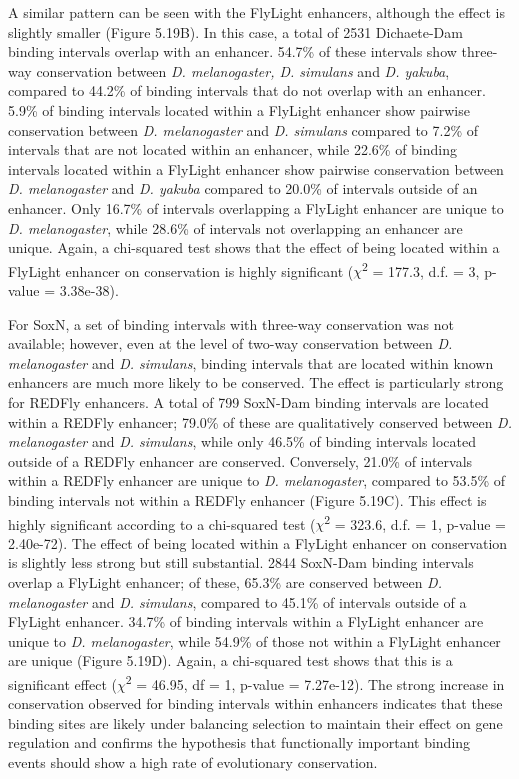 A similar pattern can be seen with the FlyLight enhancers, although the effect is slightly smaller (Figure 5.19B). In this case, a total of 2531 Dichaete-Dam binding intervals overlap with an enhancer. 54.7\% of these intervals show three-way conservation between \emph{D. melanogaster, D. simulans} and \emph{D. yakuba}, compared to 44.2\% of binding intervals that do not overlap with an enhancer. 5.9\% of binding intervals located within a FlyLight enhancer show pairwise conservation between \emph{D. melanogaster} and \emph{D. simulans} compared to 7.2\% of intervals that are not located within an enhancer, while 22.6\% of binding intervals located within a FlyLight enhancer show pairwise conservation between \emph{D. melanogaster} and \emph{D. yakuba} compared to 20.0\% of intervals outside of an enhancer. Only 16.7\% of intervals overlapping a FlyLight enhancer are unique to \emph{D. melanogaster}, while 28.6\% of intervals not overlapping an enhancer are unique. Again, a chi-squared test shows that the effect of being located within a FlyLight enhancer on conservation is highly significant (\(\chi\)\textsuperscript{2} = 177.3, d.f. = 3, p-value = 3.38e-38).

For SoxN, a set of binding intervals with three-way conservation was not available; however, even at the level of two-way conservation between \emph{D. melanogaster} and \emph{D. simulans}, binding intervals that are located within known enhancers are much more likely to be conserved. The effect is particularly strong for REDFly enhancers. A total of 799 SoxN-Dam binding intervals are located within a REDFly enhancer; 79.0\% of these are qualitatively conserved between \emph{D. melanogaster} and \emph{D. simulans}, while only 46.5\% of binding intervals located outside of a REDFly enhancer are conserved. Conversely, 21.0\% of intervals within a REDFly enhancer are unique to \emph{D. melanogaster}, compared to 53.5\% of binding intervals not within a REDFly enhancer (Figure 5.19C). This effect is highly significant according to a chi-squared test (\(\chi\)\textsuperscript{2} = 323.6, d.f. = 1, p-value = 2.40e-72). The effect of being located within a FlyLight enhancer on conservation is slightly less strong but still substantial. 2844 SoxN-Dam binding intervals overlap a FlyLight enhancer; of these, 65.3\% are conserved between \emph{D. melanogaster} and \emph{D. simulans}, compared to 45.1\% of intervals outside of a FlyLight enhancer. 34.7\% of binding intervals within a FlyLight enhancer are unique to \emph{D. melanogaster}, while 54.9\% of those not within a FlyLight enhancer are unique (Figure 5.19D). Again, a chi-squared test shows that this is a significant effect (\(\chi\)\textsuperscript{2} = 46.95, df = 1, p-value = 7.27e-12). The strong increase in conservation observed for binding intervals within enhancers indicates that these binding sites are likely under balancing selection to maintain their effect on gene regulation and confirms the hypothesis that functionally important binding events should show a high rate of evolutionary conservation.

